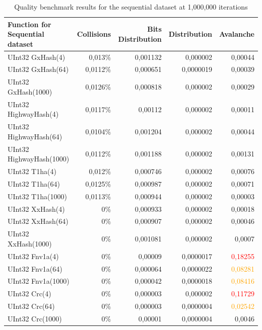 \documentclass[10pt]{article}
\begin{document}
\begin{table}[H]
\centering
\begin{tabular}{|l|r|r|r|r|}
\hline
\textbf{Function for Sequential dataset} & \textbf{Collisions} & \textbf{Bits Distribution} & \textbf{Distribution} & \textbf{Avalanche} \\
\hline
UInt32 GxHash(4)                & 0,013\% & 0,001132  & 0,000002 & 0,00044 \\
UInt32 GxHash(64)               & 0,0112\% & 0,000651  & 0,0000019 & 0,00039 \\
UInt32 GxHash(1000)             & 0,0126\% & 0,000818  & 0,000002 & 0,00029 \\
UInt32 HighwayHash(4)            & 0,0117\% & 0,00112   & 0,000002 & 0,00011 \\
UInt32 HighwayHash(64)           & 0,0104\% & 0,001204  & 0,000002 & 0,00044 \\
UInt32 HighwayHash(1000)         & 0,0112\% & 0,001188  & 0,000002 & 0,00131 \\
UInt32 T1ha(4)                   & 0,012\%  & 0,000746  & 0,000002 & 0,00076 \\
UInt32 T1ha(64)                  & 0,0125\% & 0,000987  & 0,000002 & 0,00071 \\
UInt32 T1ha(1000)                & 0,0113\% & 0,000944  & 0,000002 & 0,00003 \\
UInt32 XxHash(4)                & 0\%      & 0,000933  & 0,000002 & 0,00018 \\
UInt32 XxHash(64)               & 0\%      & 0,000907  & 0,000002 & 0,00046 \\
UInt32 XxHash(1000)             & 0\%      & 0,001081  & 0,000002 & 0,0007 \\
UInt32 Fnv1a(4)                 & 0\%      & 0,00009   & 0,0000017 & \textcolor{red}{0,18255} \\
UInt32 Fnv1a(64)                & 0\%      & 0,000064  & 0,0000022 & \textcolor{orange}{0,08281} \\
UInt32 Fnv1a(1000)              & 0\%      & 0,000042  & 0,0000018 & \textcolor{orange}{0,08416} \\
UInt32 Crc(4)                   & 0\%      & 0,000003  & 0,000002 & \textcolor{red}{0,11729} \\
UInt32 Crc(64)                  & 0\%      & 0,000003  & 0,0000004 & \textcolor{orange}{0,02542} \\
UInt32 Crc(1000)                & 0\%      & 0,00001   & 0,0000004 & 0,0046 \\
\hline
\end{tabular}
\caption{Quality benchmark results for the sequential dataset at 1,000,000 iterations}
\label{tab:my_label}
\end{table}
\end{document}
